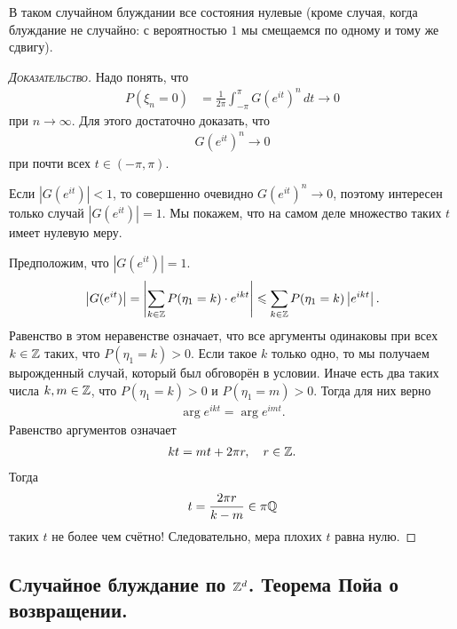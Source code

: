 \documentclass[../main.tex]{subfiles}
\begin{document}
 \begin{remrk}
  В таком случайном блуждании все состояния нулевые (кроме случая, когда блуждание не случайно: с вероятностью $ 1 $ мы смещаемся по одному и тому же сдвигу).
 \end{remrk}
 \begin{proof}[\normalfont\textsc{Доказательство}]
  Надо понять, что
  \begin{align*}
   P(\xi_n = 0) &= \frac{1}{2\pi} \int_{-\pi}^{\pi} G(e^{it})^{n}\,dt \to 0
  \end{align*} при $ n \to \infty $. Для этого достаточно доказать, что
  \begin{align*}
   G(e^{it})^{n} \to 0
  \end{align*} при почти всех $ t \in (-\pi, \pi) $.

  Если $ \left| G(e^{it}) \right| < 1 $, то совершенно очевидно $G(e^{it})^{n} \to 0$, поэтому интересен только случай $ \left| G(e^{it}) \right| = 1 $. Мы покажем, что на самом деле множество таких $ t $ имеет нулевую меру.

  Предположим, что $ \left| G(e^{it}) \right|=1 $.
  \begin{align*}
   \left| G(e^{it}) \right| = \left| \sum_{k \in \mathbb{Z}} P(\eta_1 =k) \cdot e^{ikt} \right| \leqslant \sum_{k \in \mathbb{Z}} P(\eta_1 = k) \left| e^{ikt} \right|.
  \end{align*} Равенство в этом неравенстве означает, что все аргументы одинаковы при всех $ k \in \mathbb{Z} $ таких, что $ P(\eta_1 = k) > 0 $. Если такое $ k $ только одно, то мы получаем вырожденный случай, который был обговорён в условии. Иначе есть два таких числа $ k,m\in\mathbb{Z} $, что $ P(\eta_1 = k) > 0 $ и $ P(\eta_1 = m) > 0 $. Тогда для них верно
  \begin{align*}
   \arg e^{ikt} = \arg e^{imt}.
  \end{align*} Равенство аргументов означает
  \begin{align*}
   kt = mt + 2\pi r, \quad r \in\mathbb{Z}.
  \end{align*} Тогда
  \begin{align*}
   t = \frac{2\pi r}{k - m} \in \pi \mathbb{Q}
  \end{align*} таких $ t $ не более чем счётно! Следовательно, мера плохих $ t $ равна нулю.
 \end{proof}

 \subsection{Случайное блуждание по \texorpdfstring{$\mathbb{Z}^{d}$}{Zd}. Теорема Пойа о возвращении.}
\end{document}
